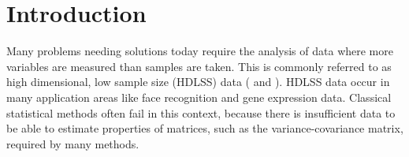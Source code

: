 \documentclass[12]{article}
\newcommand{\blue}{\color{blue}}
\begin{document}
%
%

\section{Introduction} 


Many problems needing solutions today require the analysis of data where more variables are measured than samples are taken. This is commonly referred to as high dimensional, low sample size (HDLSS) data (\cite{hall:2005} and \cite{marron:2007}). %
HDLSS data occur in many application areas like face recognition and gene expression data. Classical statistical methods often fail in this context, because there is insufficient data to be able to estimate properties of matrices, such as the variance-covariance matrix, required by many methods. 
\end{document}
